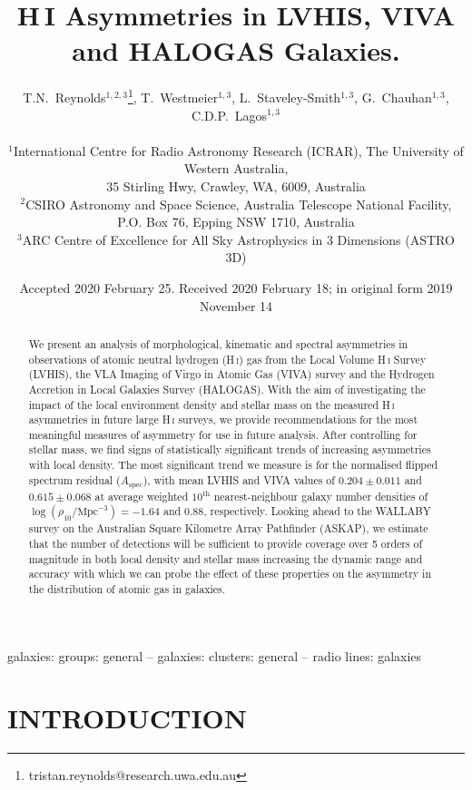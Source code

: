 \documentclass[fleqn,usenatbib]{mnras}
\title[H\,I Asymmetries in LVHIS, VIVA and HALOGAS Galaxies]{H\,I Asymmetries in LVHIS, VIVA and HALOGAS Galaxies.}
\author[T.N.~Reynolds, et al.]{T.N.~Reynolds$^{1,2,3}$\thanks{tristan.reynolds@research.uwa.edu.au}, 
T.~Westmeier$^{1,3}$,
L.~Staveley-Smith$^{1,3}$,
G.~Chauhan$^{1,3}$,
\newauthor C.D.P.~Lagos$^{1,3}$\\
\\
$^1$International Centre for Radio Astronomy Research (ICRAR), The University of Western Australia,\\ 35 Stirling Hwy, Crawley, WA, 6009, Australia\\
$^2$CSIRO Astronomy and Space Science, Australia Telescope National Facility, P.O. Box 76, Epping NSW 1710, Australia\\
$^3$ARC Centre of Excellence for All Sky Astrophysics in 3 Dimensions (ASTRO 3D)
}
\date{Accepted 2020 February 25. Received 2020 February 18; in original form 2019 November 14}
\begin{document}
\label{firstpage}
\pagerange{\pageref{firstpage}--\pageref{lastpage}}
\maketitle

\begin{abstract}
We present an analysis of morphological, kinematic and spectral asymmetries in observations of atomic neutral hydrogen (H\,\textsc{i}) gas from the Local Volume H\,\textsc{i} Survey (LVHIS), the VLA Imaging of Virgo in Atomic Gas (VIVA) survey and the Hydrogen Accretion in Local Galaxies Survey (HALOGAS). With the aim of investigating the impact of the local environment density and stellar mass on the measured H\,\textsc{i} asymmetries in future large H\,\textsc{i} surveys, we provide recommendations for the most meaningful measures of asymmetry for use in future analysis. After controlling for stellar mass, we find signs of statistically significant trends of increasing asymmetries with local density. The most significant trend we measure is for the normalised flipped spectrum residual ($A_{\mathrm{spec}}$), with mean LVHIS and VIVA values of $0.204\pm0.011$ and $0.615\pm0.068$ at average weighted $10^{\mathrm{th}}$ nearest-neighbour galaxy number densities of $\log(\rho_{10}/\mathrm{Mpc}^{-3})=-1.64$ and 0.88, respectively. Looking ahead to the WALLABY survey on the Australian Square Kilometre Array Pathfinder (ASKAP), we estimate that the number of detections will be sufficient to provide coverage over 5 orders of magnitude in both local density and stellar mass increasing the dynamic range and accuracy with which we can probe the effect of these properties on the asymmetry in the distribution of atomic gas in galaxies.
\end{abstract}

\begin{keywords}
galaxies: groups: general -- galaxies: clusters: general -- radio lines: galaxies
\end{keywords}



\section{INTRODUCTION}
\label{sec:intro}
\end{document}
